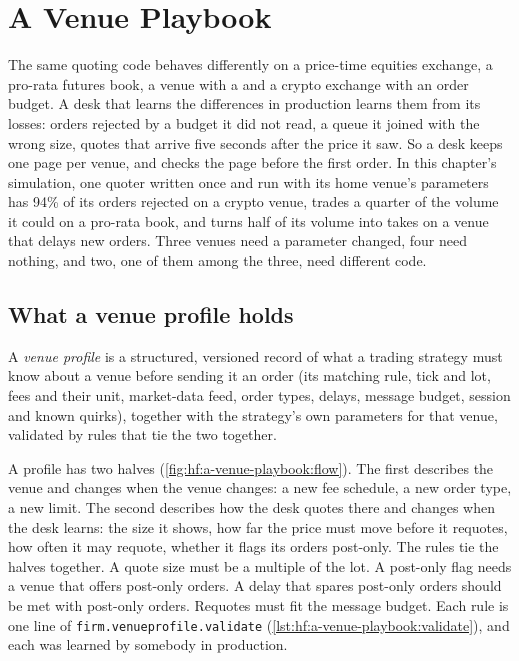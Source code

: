 \chapter{A Venue Playbook}\label{ch:hf:a-venue-playbook}

The same quoting code behaves differently on a price-time equities exchange, a pro-rata futures book, a venue with a  and a crypto
exchange with an order budget. A desk that learns the differences in production learns them from its losses: orders rejected by a budget it did not
read, a queue it joined with the wrong size, quotes that arrive five seconds after the price it saw. So a desk keeps one page per venue, and checks
the page before the first order. In this chapter's simulation, one quoter written once and run with its home venue's parameters has 94\% of its
orders rejected on a crypto venue, trades a quarter of the volume it could on a pro-rata book, and turns half of its volume into takes on a venue that
delays new orders. Three venues need a parameter changed, four need nothing, and two, one of them among the three, need different code.

\section{What a venue profile holds}

\begin{definition}\label{def:hf:a-venue-playbook:profile}
A \emph{venue profile} is a structured, versioned record of what a trading strategy must know about a venue before sending
it an order (its matching rule, tick and lot, fees and their unit, market-data feed, order types, delays, message budget, session and known quirks),
together with the strategy's own parameters for that venue, validated by rules that tie the two together.
\end{definition}

A profile has two halves (\cref{fig:hf:a-venue-playbook:flow}). The first describes the venue and changes when the venue changes: a new fee
schedule, a new order type, a new limit. The second describes how the desk quotes there and changes when the desk learns: the size it shows, how far
the price must move before it requotes, how often it may requote, whether it flags its orders post-only. The rules tie the halves together. A
quote size must be a multiple of the lot. A post-only flag needs a venue that offers post-only orders. A delay that spares post-only orders
should be met with post-only orders. Requotes must fit the message budget. Each rule is one line of \texttt{firm.venueprofile.validate}
(\cref{lst:hf:a-venue-playbook:validate}), and each was learned by somebody in production.

